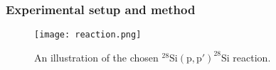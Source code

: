 \documentclass{beamer}              %
\begin{document}
%

\begin{frame}
\frametitle{Experimental setup and method}
\begin{figure}[htp]
\centering
\texttt{[image: reaction.png]}
\caption{An illustration of the chosen ${}^{28}\mathrm{Si(p,p')}^{28}\mathrm{Si}$ reaction.}
\label{fig: reaction}
\end{figure}
\end{frame}

\end{document}
